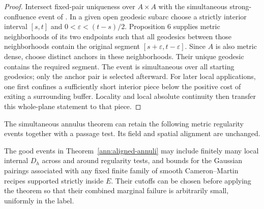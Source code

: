 \begin{proof}
Intersect fixed-pair uniqueness over $A\times A$ with the simultaneous
strong-confluence event of
\cite[Theorem 2 and Proposition 6]{BhatiaKavvadiasConfluence}.
In a given open geodesic subarc choose a strictly interior interval
$[s,t]$ and $0<\varepsilon<(t-s)/2$.  Proposition 6 supplies metric
neighborhoods of its two endpoints such that all geodesics between
those neighborhoods contain the original segment
$[s+\varepsilon,t-\varepsilon]$.  Since $A$ is also metric dense,
choose distinct anchors in these neighborhoods.  Their unique
geodesic contains the required segment.  The event is simultaneous
over all starting geodesics; only the anchor pair is selected afterward.
For later local applications, one first confines a sufficiently short
interior piece below the positive cost of exiting a surrounding buffer.
Locality and local absolute continuity then transfer this whole-plane
statement to that piece.
\end{proof}

The simultaneous annulus theorem can retain the following metric
regularity events together with a passage test.  Its field and spatial
alignment are unchanged.

\begin{corollary}\label{ann:pairings}
The good events in Theorem~\ref{ann:aligned-annuli} may include
finitely many local internal \(D_h\) across and around regularity
tests, and bounds for the Gaussian pairings associated with any
fixed finite family of smooth Cameron--Martin recipes supported
strictly inside \(E\).  Their cutoffs can be chosen before applying
the theorem so that their combined marginal failure is arbitrarily
small, uniformly in the label.
\end{corollary}

